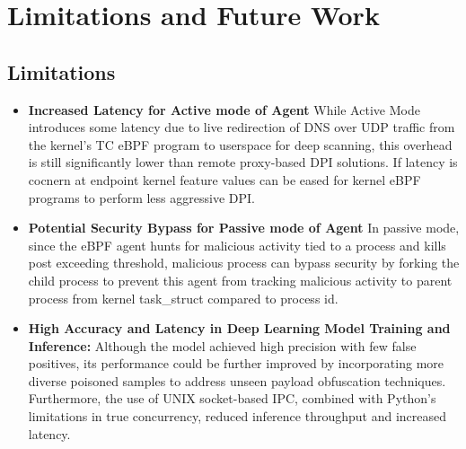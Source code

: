 \documentclass [11pt, proquest] {uwthesis}[2020/02/24]
\begin{document}
\section*{Limitations and Future Work}

\subsection*{Limitations}

\begin{itemize}[nosep]

    \item \textbf{Increased Latency for Active mode of Agent}
     While Active Mode introduces some latency due to live redirection of DNS over UDP traffic from the kernel’s TC eBPF program to userspace for deep scanning, this overhead is still significantly lower than remote proxy-based DPI solutions. If latency is cocnern at endpoint kernel feature values can be eased for kernel eBPF programs to perform less aggressive DPI.

    \item \textbf{Potential Security Bypass for Passive mode of Agent}
    In passive mode, since the eBPF agent hunts for malicious activity tied to a process and kills post exceeding threshold, malicious process can bypass security by forking the child process to prevent this agent from tracking malicious activity to parent process from kernel task\_struct compared to process id.

    \item \textbf{High Accuracy and Latency in Deep Learning Model Training and Inference:} Although the model achieved high precision with few false positives, its performance could be further improved by incorporating more diverse poisoned samples to address unseen payload obfuscation techniques. Furthermore, the use of UNIX socket-based IPC, combined with Python's limitations in true concurrency, reduced inference throughput and increased latency.


\end{itemize}
\end{document}
